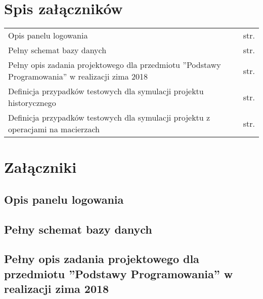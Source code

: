 \chapter*{Spis załączników}
\noindent

\begin{tabularx}{\textwidth}{Xl}

    Opis panelu logowania & str. \pageref{file:login-panel} \\

    Pełny schemat bazy danych & str. \pageref{file:database-schema} \\

    Pełny opis zadania projektowego dla przedmiotu ”Podstawy Programowania” w realizacji zima 2018 & str. \pageref{file:penguins_description} \\

    Definicja przypadków testowych dla symulacji projektu historycznego & str. \pageref{file:test_cases_penguins} \\

    Definicja przypadków testowych dla symulacji projektu z operacjami na macierzach & str. \pageref{file:test_cases_matrix} \\

\end{tabularx}

\chapter*{Załączniki}


\section*{Opis panelu logowania}
\label{file:login-panel}
{

}

\section*{Pełny schemat bazy danych}
\label{file:database-schema}
{
\scriptsize

}

\section*{Pełny opis zadania projektowego dla przedmiotu ”Podstawy Programowania” w realizacji zima 2018}
\label{file:penguins_description}
{

}


